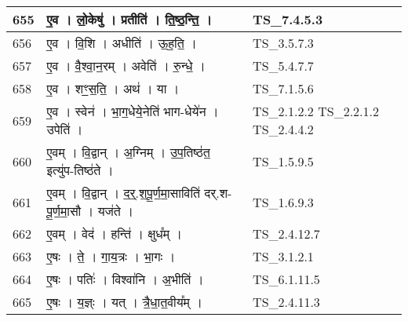 \documentclass[17pt]{extarticle}
\begin{document}
\begin{longtable}{||p{0.4in}||p{4.9in}||p{0.9in}||}
    \hline
        
    655 & ए॒व   ।   लो॒केषु॑   ।   प्रतीति॑   ।   ति॒ष्ठ॒न्ति॒   ।    & TS\_7.4.5.3       \\
    
    \hline
        
    656 & ए॒व   ।   वि॒शि   ।   अधीति॑   ।   ऊ॒ह॒ति॒   ।    & TS\_3.5.7.3       \\
    
    \hline
        
    657 & ए॒व   ।   वै॒श्वा॒न॒रम्   ।   अवेति॑   ।   रु॒न्धे॒   ।    & TS\_5.4.7.7       \\
    
    \hline
        
    658 & ए॒व   ।   शꣳ॒॒स॒ति॒   ।   अथ॑   ।   या   ।    & TS\_7.1.5.6       \\
    
    \hline
        
    659 & ए॒व   ।   स्वेन॑   ।   भा॒ग॒धेये॒नेति॑ भाग{-}धेये॑न   ।   उपेति॑   ।    & TS\_2.1.2.2 TS\_2.2.1.2 TS\_2.4.4.2       \\
    
    \hline
        
    660 & ए॒वम्   ।   वि॒द्वान्   ।   अ॒ग्निम्   ।   उ॒प॒तिष्ठ॑त॒ इत्यु॑प{-}तिष्ठ॑ते   ।    & TS\_1.5.9.5       \\
    
    \hline
        
    661 & ए॒वम्   ।   वि॒द्वान्   ।   द॒र्॒.श॒पू॒र्ण॒मा॒साविति॑ दर्.श{-}पू॒र्ण॒मा॒सौ   ।   यज॑ते   ।    & TS\_1.6.9.3       \\
    
    \hline
        
    662 & ए॒वम्   ।   वेद॑   ।   हन्ति॑   ।   क्षुध᳚म्   ।    & TS\_2.4.12.7       \\
    
    \hline
        
    663 & ए॒षः   ।   ते॒   ।   गा॒य॒त्रः   ।   भा॒गः   ।    & TS\_3.1.2.1       \\
    
    \hline
        
    664 & ए॒षः   ।   पतिः॑   ।   विश्वा॑नि   ।   अ॒भीति॑   ।    & TS\_6.1.11.5       \\
    
    \hline
        
    665 & ए॒षः   ।   य॒ज्ञ्ः   ।   यत्   ।   त्रै॒धा॒त॒वीय᳚म्   ।    & TS\_2.4.11.3       \\
    

\end{longtable}
\end{document}
